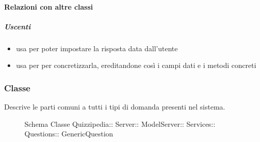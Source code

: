 \paragraph{Relazioni con altre classi}
\subparagraph{Uscenti}
\begin{itemize}
\item usa  per poter impostare la risposta data dall'utente
\item usa  per per concretizzarla, ereditandone così i campi dati e i metodi concreti
\end{itemize}
\subsubsection{Classe }
Descrive le parti comuni a tutti i tipi di domanda presenti nel sistema.
\begin{figure}[H]
\centering
\noindent{}
\caption[Schema Classe GenericQuestion]{Schema Classe Quizzipedia:: Server:: ModelServer:: Services:: Questions:: GenericQuestion}
\end{figure}
